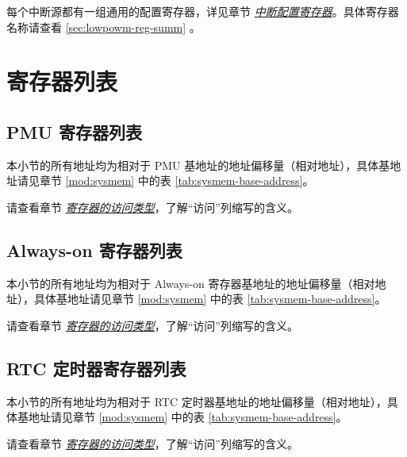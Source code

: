 \documentclass[main\_\_CN.tex]{subfiles}
\begin{document}
每个中断源都有一组通用的配置寄存器，详见章节 \hyperref[interrupt-config-registers]{\textit{中断配置寄存器}}。具体寄存器名称请查看 \ref{sec:lowpowm-reg-summ} \textit{}。


\clearpage
\section{寄存器列表}\hypertarget{lowpowm-reg-summ}{}\label{sec:lowpowm-reg-summ}

\subsection{PMU 寄存器列表}

本小节的所有地址均为相对于 PMU 基地址的地址偏移量（相对地址），具体基地址请见章节 \ref{mod:sysmem} \textit{} 中的表 \ref{tab:sysmem-base-address}。

请查看章节 \hyperref[glossary-access-types]{\textit{寄存器的访问类型}}，了解“访问”列缩写的含义。



\subsection{Always-on 寄存器列表}

本小节的所有地址均为相对于 Always-on 寄存器基地址的地址偏移量（相对地址），具体基地址请见章节 \ref{mod:sysmem} \textit{} 中的表 \ref{tab:sysmem-base-address}。

请查看章节 \hyperref[glossary-access-types]{\textit{寄存器的访问类型}}，了解“访问”列缩写的含义。



\subsection{RTC 定时器寄存器列表}

本小节的所有地址均为相对于 RTC 定时器基地址的地址偏移量（相对地址），具体基地址请见章节 \ref{mod:sysmem} \textit{} 中的表 \ref{tab:sysmem-base-address}。

请查看章节 \hyperref[glossary-access-types]{\textit{寄存器的访问类型}}，了解“访问”列缩写的含义。



\clearpage
\end{document}
